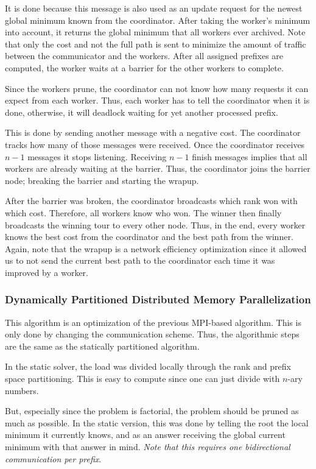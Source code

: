 It is done because this message is also used as an update request for the newest global minimum known from the coordinator. After taking the worker's minimum into account, it returns the global minimum that all workers ever archived. Note that only the cost and not the full path is sent to minimize the amount of traffic between the communicator and the workers. After all assigned prefixes are computed, the worker waits at a barrier for the other workers to complete.

Since the workers prune, the coordinator can not know how many requests it can expect from each worker. Thus, each worker has to tell the coordinator when it is done, otherwise, it will deadlock waiting for yet another processed prefix.

This is done by sending another message with a negative cost. The coordinator tracks how many of those messages were received. Once the coordinator receives $n-1$ messages it stops listening. Receiving $n-1$ finish messages implies that all workers are already waiting at the barrier. Thus, the coordinator joins the barrier node; breaking the barrier and starting the wrapup.

After the barrier was broken, the coordinator broadcasts which rank won with which cost. Therefore, all workers know who won. The winner then finally broadcasts the winning tour to every other node. Thus, in the end, every worker knows the best cost from the coordinator and the best path from the winner. Again, note that the wrapup is a network efficiency optimization since it allowed us to not send the current best path to the coordinator each time it was improved by a worker.

\subsubsection{Dynamically Partitioned Distributed Memory Parallelization}

This algorithm is an optimization of the previous \acs{MPI}-based algorithm. This is only done by changing the communication scheme. Thus, the algorithmic steps are the same as the statically partitioned algorithm.

In the static solver, the load was divided locally through the rank and prefix space partitioning. This is easy to compute since one can just divide with $n$-ary numbers.

But, especially since the problem is factorial, the problem should be pruned as much as possible. In the static version, this was done by telling the root the local minimum it currently knows, and as an answer receiving the global current minimum with that answer in mind. \emph{Note that this requires one bidirectional communication per prefix}.

